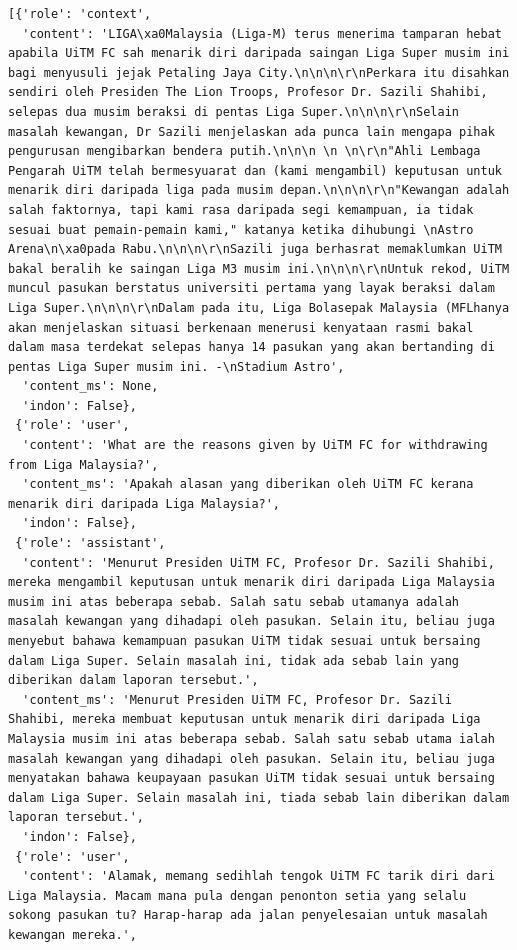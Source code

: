 \documentclass{article}
\begin{document}
\begin{lstlisting}[breaklines=true]
  [{'role': 'context',
  'content': 'LIGA\xa0Malaysia (Liga-M) terus menerima tamparan hebat apabila UiTM FC sah menarik diri daripada saingan Liga Super musim ini bagi menyusuli jejak Petaling Jaya City.\n\n\n\r\nPerkara itu disahkan sendiri oleh Presiden The Lion Troops, Profesor Dr. Sazili Shahibi, selepas dua musim beraksi di pentas Liga Super.\n\n\n\r\nSelain masalah kewangan, Dr Sazili menjelaskan ada punca lain mengapa pihak pengurusan mengibarkan bendera putih.\n\n\n \n \n\r\n"Ahli Lembaga Pengarah UiTM telah bermesyuarat dan (kami mengambil) keputusan untuk menarik diri daripada liga pada musim depan.\n\n\n\r\n"Kewangan adalah salah faktornya, tapi kami rasa daripada segi kemampuan, ia tidak sesuai buat pemain-pemain kami," katanya ketika dihubungi \nAstro Arena\n\xa0pada Rabu.\n\n\n\r\nSazili juga berhasrat memaklumkan UiTM bakal beralih ke saingan Liga M3 musim ini.\n\n\n\r\nUntuk rekod, UiTM muncul pasukan berstatus universiti pertama yang layak beraksi dalam Liga Super.\n\n\n\r\nDalam pada itu, Liga Bolasepak Malaysia (MFLhanya akan menjelaskan situasi berkenaan menerusi kenyataan rasmi bakal dalam masa terdekat selepas hanya 14 pasukan yang akan bertanding di pentas Liga Super musim ini. -\nStadium Astro',
  'content_ms': None,
  'indon': False},
 {'role': 'user',
  'content': 'What are the reasons given by UiTM FC for withdrawing from Liga Malaysia?',
  'content_ms': 'Apakah alasan yang diberikan oleh UiTM FC kerana menarik diri daripada Liga Malaysia?',
  'indon': False},
 {'role': 'assistant',
  'content': 'Menurut Presiden UiTM FC, Profesor Dr. Sazili Shahibi, mereka mengambil keputusan untuk menarik diri daripada Liga Malaysia musim ini atas beberapa sebab. Salah satu sebab utamanya adalah masalah kewangan yang dihadapi oleh pasukan. Selain itu, beliau juga menyebut bahawa kemampuan pasukan UiTM tidak sesuai untuk bersaing dalam Liga Super. Selain masalah ini, tidak ada sebab lain yang diberikan dalam laporan tersebut.',
  'content_ms': 'Menurut Presiden UiTM FC, Profesor Dr. Sazili Shahibi, mereka membuat keputusan untuk menarik diri daripada Liga Malaysia musim ini atas beberapa sebab. Salah satu sebab utama ialah masalah kewangan yang dihadapi oleh pasukan. Selain itu, beliau juga menyatakan bahawa keupayaan pasukan UiTM tidak sesuai untuk bersaing dalam Liga Super. Selain masalah ini, tiada sebab lain diberikan dalam laporan tersebut.',
  'indon': False},
 {'role': 'user',
  'content': 'Alamak, memang sedihlah tengok UiTM FC tarik diri dari Liga Malaysia. Macam mana pula dengan penonton setia yang selalu sokong pasukan tu? Harap-harap ada jalan penyelesaian untuk masalah kewangan mereka.',

\end{lstlisting}
\end{document}
